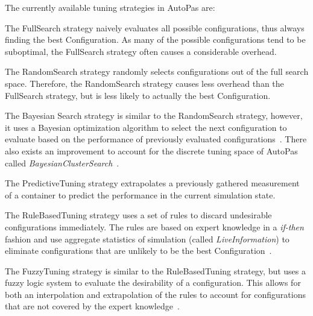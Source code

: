 \documentclass[conference]{IEEEtran}
\begin{document}
The currently available tuning strategies in AutoPas are:

\begin{description}[style=nextline]
    \item[FullSearch]
        The FullSearch strategy naively evaluates all possible configurations, thus always finding the best Configuration. As many of the possible configurations tend to be suboptimal\cite{Manuel_Lerchner_Thesis.pdf}, the FullSearch strategy often causes a considerable overhead.

    \item[RandomSearch]
        The RandomSearch strategy randomly selects configurations out of the full search space. Therefore, the RandomSearch strategy causes less overhead than the FullSearch strategy, but is less likely to actually the best Configuration.

    \item[BayesianSearch]
        The Bayesian Search strategy is similar to the RandomSearch strategy, however, it uses a Bayesian optimization algorithm to select the next configuration to evaluate based on the performance of previously evaluated configurations~\cite{njan_master}. There also exists an improvement to account for the discrete tuning space of AutoPas called \textit{BayesianClusterSearch}~\cite{njan_master}.

    \item[PredictiveTuning]
        The PredictiveTuning strategy extrapolates a previously gathered measurement of a container to predict the performance in the current simulation state.

    \item[RuleBasedTuning]
        The RuleBasedTuning strategy uses a set of rules to discard undesirable configurations immediately. The rules are based on expert knowledge in a \textit{if-then} fashion and use aggregate statistics of simulation (called \textit{LiveInformation}) to eliminate configurations that are unlikely to be the best Configuration~\cite{endreport.pdf}.

    \item[FuzzyTuning]
        The FuzzyTuning strategy is similar to the RuleBasedTuning strategy, but uses a fuzzy logic system to evaluate the desirability of a configuration. This allows for both an interpolation and extrapolation of the rules to account for configurations that are not covered by the expert knowledge~\cite{Manuel_Lerchner_Thesis.pdf}.

\end{description}
\end{document}
